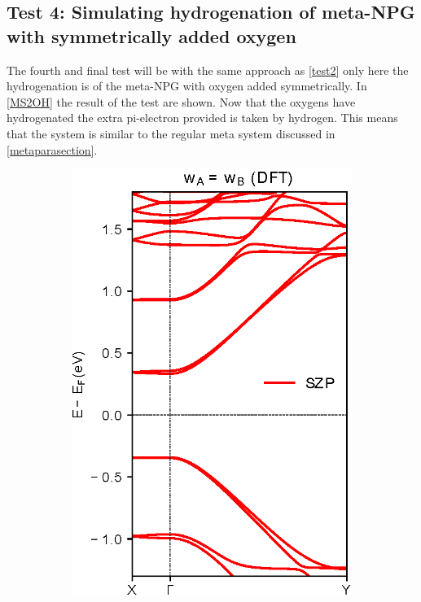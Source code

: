 \subsection{Test 4: Simulating hydrogenation of meta-NPG with symmetrically added oxygen}\label{test4}
The fourth and final test will be with the same approach as \cref{test2} only here the hydrogenation is of the meta-NPG with oxygen added symmetrically. In \cref{MS2OH} the result of the test are shown. Now that the oxygens have hydrogenated the extra pi-electron provided is taken by hydrogen. This means that the system is similar to the regular meta system discussed in \cref{metaparasection}.
\begin{figure}[h]
	\centering
	\begin{subfigure}[b]{0.3\textwidth}
		\centering
		\includegraphics[width=\textwidth]{Figures/MS2OHDFT.eps}

\end{subfigure}
\end{figure}
